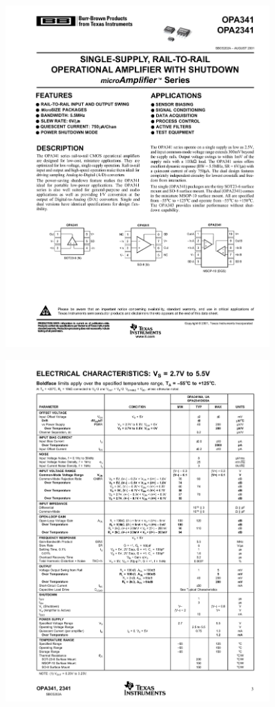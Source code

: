 \documentclass[russian, utf8, 12pt]{eskdtext}
\begin{document}
\ESKDappendix{}{}
\begin{figure} [h!]
	\centering
	\includegraphics[width = 0.9\textwidth]{opa341-1.pdf}
\end{figure}
\begin{figure} [h!]
	\centering
	\includegraphics[width = 0.9\textwidth]{opa341-2.pdf}
\end{figure}
\end{document}
